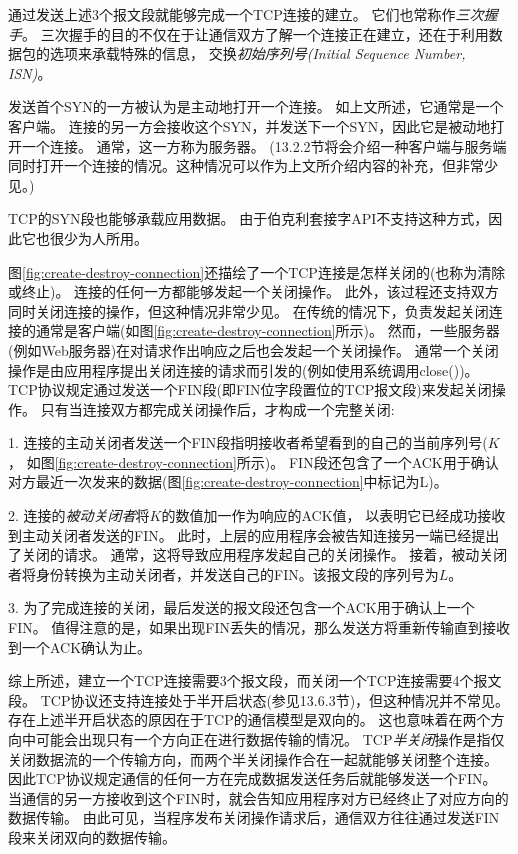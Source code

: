 \documentclass{../main.tex}{subfiles}
\begin{document}
通过发送上述3个报文段就能够完成一个TCP连接的建立。
它们也常称作\emph{三次握手}。
三次握手的目的不仅在于让通信双方了解一个连接正在建立，还在于利用数据包的选项来承载特殊的信息，
    交换\emph{初始序列号(Initial Sequence Number, ISN)}。

发送首个SYN的一方被认为是主动地打开一个连接。
如上文所述，它通常是一个客户端。
连接的另一方会接收这个SYN，并发送下一个SYN，因此它是被动地打开一个连接。
通常，这一方称为服务器。
(13.2.2节将会介绍一种客户端与服务端同时打开一个连接的情况。这种情况可以作为上文所介绍内容的补充，但非常少见。)

\begin{tcolorbox}[title={注意}]
    TCP的SYN段也能够承载应用数据。
    由于伯克利套接字API不支持这种方式，因此它也很少为人所用。
\end{tcolorbox}

图\ref{fig:create-destroy-connection}还描绘了一个TCP连接是怎样关闭的(也称为清除或终止)。
连接的任何一方都能够发起一个关闭操作。
此外，该过程还支持双方同时关闭连接的操作，但这种情况非常少见。
在传统的情况下，负责发起关闭连接的通常是客户端(如图\ref{fig:create-destroy-connection}所示)。
然而，一些服务器(例如Web服务器)在对请求作出响应之后也会发起一个关闭操作。
通常一个关闭操作是由应用程序提出关闭连接的请求而引发的(例如使用系统调用close())。
TCP协议规定通过发送一个FIN段(即FIN位字段置位的TCP报文段)来发起关闭操作。
只有当连接双方都完成关闭操作后，才构成一个完整关闭:

1. 连接的主动关闭者发送一个FIN段指明接收者希望看到的自己的当前序列号($K$， 如图\ref{fig:create-destroy-connection}所示)。
FIN段还包含了一个ACK用于确认对方最近一次发来的数据(图\ref{fig:create-destroy-connection}中标记为L)。

2. 连接的\emph{被动关闭者}将$K$的数值加一作为响应的ACK值，
    以表明它已经成功接收到主动关闭者发送的FIN。
此时，上层的应用程序会被告知连接另一端已经提出了关闭的请求。
通常，这将导致应用程序发起自己的关闭操作。
接着，被动关闭者将身份转换为主动关闭者，并发送自己的FIN。该报文段的序列号为$L$。

3. 为了完成连接的关闭，最后发送的报文段还包含一个ACK用于确认上一个FIN。
值得注意的是，如果出现FIN丢失的情况，那么发送方将重新传输直到接收到一个ACK确认为止。

综上所述，建立一个TCP连接需要3个报文段，而关闭一个TCP连接需要4个报文段。
TCP协议还支持连接处于半开启状态(参见13.6.3节)，但这种情况并不常见。
存在上述半开启状态的原因在于TCP的通信模型是双向的。
这也意味着在两个方向中可能会出现只有一个方向正在进行数据传输的情况。
TCP\emph{半关闭}操作是指仅关闭数据流的一个传输方向，而两个半关闭操作合在一起就能够关闭整个连接。
因此TCP协议规定通信的任何一方在完成数据发送任务后就能够发送一个FIN。
当通信的另一方接收到这个FIN时，就会告知应用程序对方已经终止了对应方向的数据传输。
由此可见，当程序发布关闭操作请求后，通信双方往往通过发送FIN段来关闭双向的数据传输。
\end{document}
